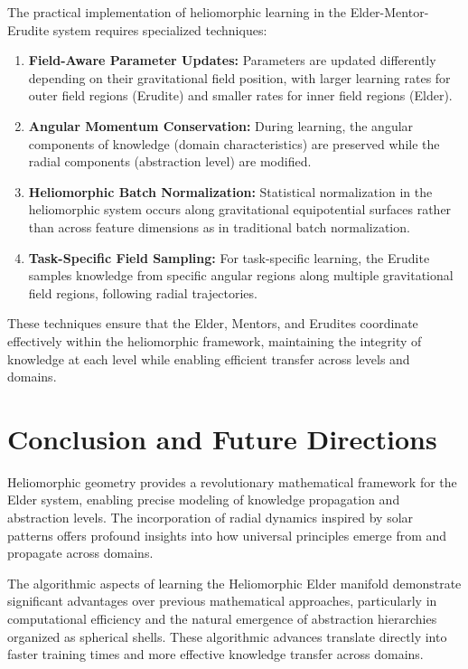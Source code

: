 The practical implementation of heliomorphic learning in the Elder-Mentor-Erudite system requires specialized techniques:

\begin{enumerate}
    \item \textbf{Field-Aware Parameter Updates:} Parameters are updated differently depending on their gravitational field position, with larger learning rates for outer field regions (Erudite) and smaller rates for inner field regions (Elder).
    
    \item \textbf{Angular Momentum Conservation:} During learning, the angular components of knowledge (domain characteristics) are preserved while the radial components (abstraction level) are modified.
    
    \item \textbf{Heliomorphic Batch Normalization:} Statistical normalization in the heliomorphic system occurs along gravitational equipotential surfaces rather than across feature dimensions as in traditional batch normalization.
    
    \item \textbf{Task-Specific Field Sampling:} For task-specific learning, the Erudite samples knowledge from specific angular regions along multiple gravitational field regions, following radial trajectories.
\end{enumerate}

These techniques ensure that the Elder, Mentors, and Erudites coordinate effectively within the heliomorphic framework, maintaining the integrity of knowledge at each level while enabling efficient transfer across levels and domains.

\section{Conclusion and Future Directions}

Heliomorphic geometry provides a revolutionary mathematical framework for the Elder system, enabling precise modeling of knowledge propagation and abstraction levels. The incorporation of radial dynamics inspired by solar patterns offers profound insights into how universal principles emerge from and propagate across domains.

The algorithmic aspects of learning the Heliomorphic Elder manifold demonstrate significant advantages over previous mathematical approaches, particularly in computational efficiency and the natural emergence of abstraction hierarchies organized as spherical shells. These algorithmic advances translate directly into faster training times and more effective knowledge transfer across domains.

